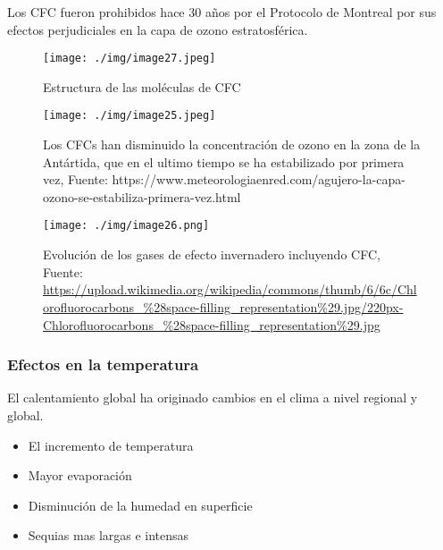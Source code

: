 \documentclass[
  a4paper,12pt]{extarticle}
\providecommand{\tightlist}{%
  \setlength{\itemsep}{0pt}\setlength{\parskip}{0pt}}
\begin{document}
Los CFC fueron prohibidos hace 30 años por el Protocolo de Montreal por
sus efectos perjudiciales en la capa de ozono estratosférica.

\begin{figure}
\begin{minipage}{0.48\textwidth}

\texttt{[image: ./img/image27.jpeg]}

\caption{ Estructura de las moléculas de CFC}
\end{minipage}\hfill%
\begin{minipage}{0.48\textwidth}

\texttt{[image: ./img/image25.jpeg]}

\caption{ Los CFCs han disminuido la concentración de ozono en la zona de la Antártida, que en el ultimo tiempo se ha estabilizado por primera vez, Fuente: https://www.meteorologiaenred.com/agujero-la-capa-ozono-se-estabiliza-primera-vez.html}
\end{minipage}
\end{figure}

\begin{figure}
\centering
\texttt{[image: ./img/image26.png]}
\caption{Evolución de los gases de efecto invernadero incluyendo CFC,
Fuente:
\url{https://upload.wikimedia.org/wikipedia/commons/thumb/6/6c/Chlorofluorocarbons_\%28space-filling_representation\%29.jpg/220px-Chlorofluorocarbons_\%28space-filling_representation\%29.jpg}}
\end{figure}

\hypertarget{efectos-en-la-temperatura}{%
\subsubsection{Efectos en la
temperatura}\label{efectos-en-la-temperatura}}

El calentamiento global ha originado cambios en el clima a nivel
regional y global.

\begin{itemize}
\tightlist
\item
  El incremento de temperatura
\item
  Mayor evaporación
\item
  Disminución de la humedad en superficie
\item
  Sequias mas largas e intensas
\end{itemize}
\end{document}
